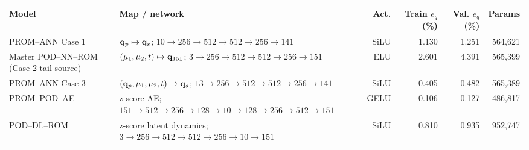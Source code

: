 \begin{tabular}{llrrrr}
\toprule
Model & Map / network & Act. & Train $e_q$ (\%) & Val. $e_q$ (\%) & Params \\
\midrule
PROM--ANN Case 1 & $\mathbf q_p\mapsto\mathbf q_s$; $10\to256\to512\to512\to256\to141$ & SiLU & 1.130 & 1.251 & 564,621 \\
Master POD--NN--ROM (Case 2 tail source) & $(\mu_1,\mu_2,t)\mapsto\mathbf q_{151}$; $3\to256\to512\to512\to256\to151$ & ELU & 2.601 & 4.391 & 565,399 \\
PROM--ANN Case 3 & $(\mathbf q_p,\mu_1,\mu_2,t)\mapsto\mathbf q_s$; $13\to256\to512\to512\to256\to141$ & SiLU & 0.405 & 0.482 & 565,389 \\
PROM--POD--AE & z-score AE; $151\to512\to256\to128\to10\to128\to256\to512\to151$ & GELU & 0.106 & 0.127 & 486,817 \\
POD--DL--ROM & z-score latent dynamics; $3\to256\to512\to512\to256\to10\to151$ & SiLU & 0.810 & 0.935 & 952,747 \\
\bottomrule
\end{tabular}
